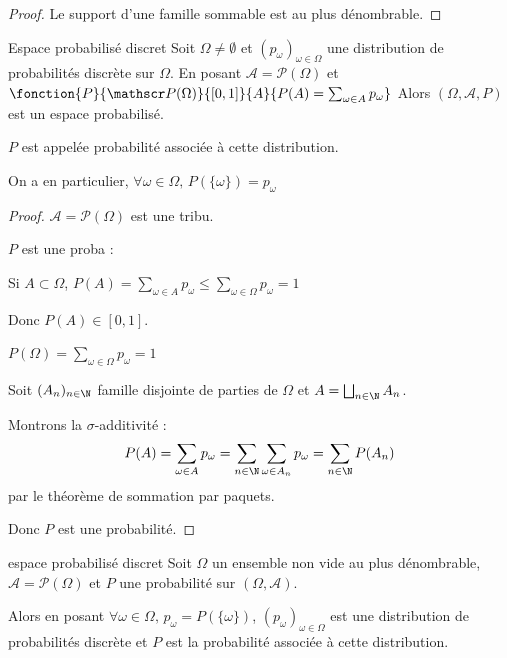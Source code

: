 \begin{proof}
    Le support d'une famille sommable est au plus dénombrable.
\end{proof}

\begin{theoreme}{Espace probabilisé discret}{}
    Soit $\Omega \neq \emptyset$ et $(p_\omega)_{\omega \in \Omega}$ une distribution de probabilités discrète
    sur $\Omega$. En posant $\mathcal A = \mathscr P(\Omega)$ et
    $\fonction{P}{\mathscr P(\Omega)}{[0, 1]}{A}{P(A) = \sum_{\omega \in A} p_\omega }$
    Alors $(\Omega, \mathcal A, P)$ est un espace probabilisé.

    $P$ est appelée probabilité associée à cette distribution. 
\end{theoreme}

\begin{remarque}
    On a en particulier, $\forall \omega \in \Omega, \, P(\{\omega\}) = p_\omega$
\end{remarque}

\begin{proof}
    $\mathcal A = \mathscr P(\Omega)$ est une tribu.

    $P$ est une proba : 

    Si $A \subset \Omega$, $P(A) = \sum_{\omega \in A} p_\omega \leqslant \sum_{\omega \in \Omega} p_\omega = 1$

    Donc $P(A) \in [0, 1]$.

    $\displaystyle P(\Omega) = \sum_{\omega \in \Omega} p_\omega = 1$

    Soit $(A_n)_{n \in \N}$ famille disjointe de parties de $\Omega$ et $A = \bigsqcup_{n \in \N} A_n$.

    Montrons la $\sigma$-additivité :
    $$ P(A) = \sum_{\omega \in A} p_\omega = \sum_{n \in \N} \sum_{\omega \in A_n} p_\omega = \sum_{n \in \N} P(A_n) $$
    par le théorème de sommation par paquets.

    Donc $P$ est une probabilité.
\end{proof}

\begin{theorement}{espace probabilisé discret}{}
    Soit $\Omega$ un ensemble non vide au plus dénombrable,
    $\mathcal A = \mathscr P(\Omega)$ et $P$ une probabilité sur $(\Omega, \mathcal A)$.

    Alors en posant $\forall \omega \in \Omega, \, p_\omega = P(\{\omega\})$,
    $(p_\omega)_{\omega \in \Omega}$ est une distribution de probabilités discrète 
    et $P$ est la probabilité associée à cette distribution.
\end{theorement}


